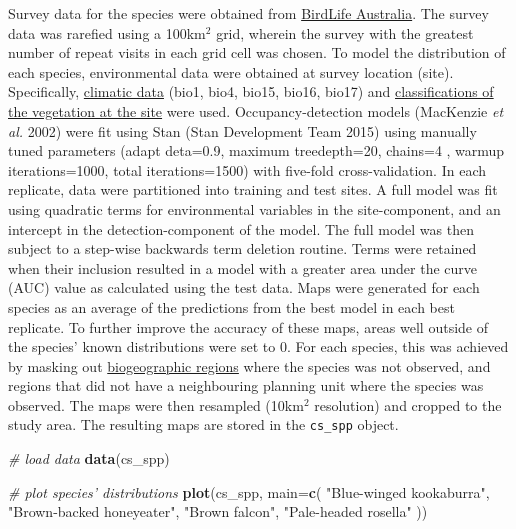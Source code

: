 \documentclass[11pt,]{article}
\newenvironment{Shaded}{\begin{snugshade}}{\end{snugshade}}
\newcommand{\KeywordTok}[1]{\textcolor[rgb]{0.13,0.29,0.53}{\textbf{{#1}}}}
\newcommand{\DataTypeTok}[1]{\textcolor[rgb]{0.13,0.29,0.53}{{#1}}}
\newcommand{\StringTok}[1]{\textcolor[rgb]{0.31,0.60,0.02}{{#1}}}
\newcommand{\CommentTok}[1]{\textcolor[rgb]{0.56,0.35,0.01}{\textit{{#1}}}}
\newcommand{\NormalTok}[1]{{#1}}
\begin{document}
Survey data for the species were obtained from
\href{http://birdlife.org.au/projects/atlas-and-birdata}{BirdLife
Australia}. The survey data was rarefied using a 100km$^2$ grid, wherein
the survey with the greatest number of repeat visits in each grid cell
was chosen. To model the distribution of each species, environmental
data were obtained at survey location (site). Specifically,
\href{http://www.worldclim.org/bioclim}{climatic data} (bio1, bio4,
bio15, bio16, bio17) and
\href{http://www.environment.gov.au/fed/catalog/search/resource/details.page?uuid=\%7BEBBCC6FA-8C13-422A-BCD7-24A9F8B52A9A\%7D}{classifications
of the vegetation at the site} were used. Occupancy-detection models
(MacKenzie \emph{et al.} 2002) were fit using Stan (Stan Development
Team 2015) using manually tuned parameters (adapt deta=0.9, maximum
treedepth=20, chains=4 , warmup iterations=1000, total iterations=1500)
with five-fold cross-validation. In each replicate, data were
partitioned into training and test sites. A full model was fit using
quadratic terms for environmental variables in the site-component, and
an intercept in the detection-component of the model. The full model was
then subject to a step-wise backwards term deletion routine. Terms were
retained when their inclusion resulted in a model with a greater area
under the curve (AUC) value as calculated using the test data. Maps were
generated for each species as an average of the predictions from the
best model in each best replicate. To further improve the accuracy of
these maps, areas well outside of the species' known distributions were
set to 0. For each species, this was achieved by masking out
\href{https://www.environment.gov.au/land/nrs/science/ibra}{biogeographic
regions} where the species was not observed, and regions that did not
have a neighbouring planning unit where the species was observed. The
maps were then resampled (10km$^2$ resolution) and cropped to the study
area. The resulting maps are stored in the \texttt{cs\_spp} object.

\begin{Shaded}
\begin{Highlighting}[]
\CommentTok{# load data}
\KeywordTok{data}\NormalTok{(cs_spp)}

\CommentTok{# plot species' distributions}
\KeywordTok{plot}\NormalTok{(cs_spp, }\DataTypeTok{main=}\KeywordTok{c}\NormalTok{(}
    \StringTok{"Blue-winged kookaburra"}\NormalTok{, }\StringTok{"Brown-backed honeyeater"}\NormalTok{, }
    \StringTok{"Brown falcon"}\NormalTok{, }\StringTok{"Pale-headed rosella"}
\NormalTok{))}
\end{Highlighting}
\end{Shaded}
\end{document}
